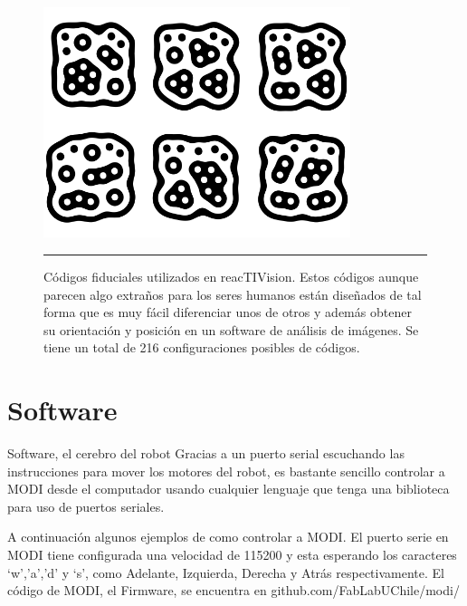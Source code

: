 \begin{figure}[htbp]
	\centering
		\includegraphics[width=0.8\textwidth]{./Figures/MODI/fiducial.png}
		\rule{35em}{0.5pt}
	\caption[Fiducial]{Códigos fiduciales utilizados en reacTIVision. Estos códigos aunque parecen algo extraños para los seres humanos están diseñados de tal forma que es muy fácil diferenciar unos de otros y además obtener su orientación y posición en un software de análisis de imágenes. Se tiene un total de 216 configuraciones posibles de códigos.}
	\label{fig:Fiducial}
\end{figure}


\section{Software}
Software, el cerebro del robot
Gracias a un puerto serial escuchando las instrucciones para mover los motores del robot, es bastante sencillo controlar a MODI desde el computador usando cualquier lenguaje que tenga una biblioteca para uso de puertos seriales.

A continuación algunos ejemplos de como controlar a MODI. El puerto serie en MODI tiene configurada una velocidad de 115200 y esta esperando los caracteres ‘w’,’a’,’d’ y ‘s’, como Adelante, Izquierda, Derecha y Atrás respectivamente. El código de MODI, el Firmware, se encuentra en github.com/FabLabUChile/modi/
